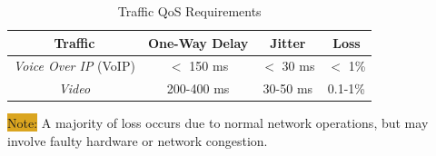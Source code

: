 \documentclass[12pt]{article}
\newcommand{\note}[1]{\colorbox{#1}{Note:}}
\begin{document}
	\begin{table}[H]
	\centering
	\caption{Traffic QoS Requirements \label{tab:QOS TRAFFIC}}
	\begin{tabular}{c | c c c}
	\textbf{Traffic}			&\textbf{One-Way Delay}	& \textbf{Jitter}	&\textbf{Loss}\\\hline
	\textit{Voice Over IP} (VoIP)	& $<$ 150 ms 			& $<$ 30 ms 	& $<$ 1\%\\
	\textit{Video}			& 200-400 ms 			& 30-50 ms 	& 0.1-1\%\\
	\end{tabular}
	\end{table}
	\note{Goldenrod} A majority of loss occurs due to normal network operations, but may involve faulty hardware or network congestion.





\end{document}
